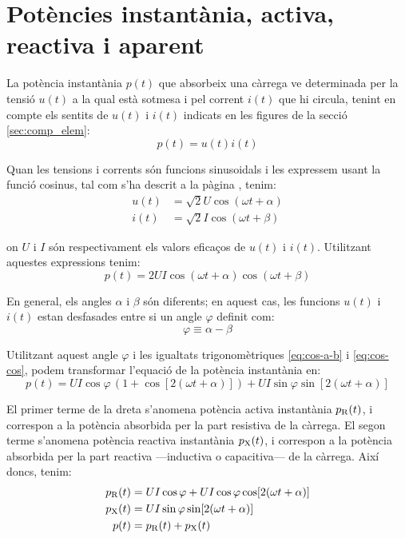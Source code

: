 \section{Potències instantània, activa,  reactiva i aparent}\label{sec:pot-inst-act-react}

La potència instantània $p(t)$ que absorbeix una càrrega ve determinada per la tensió $u(t)$ a la qual està sotmesa i pel corrent $i(t)$ que hi circula, tenint en compte els sentits de $u(t)$ i $i(t)$ indicats en les figures de la secció \ref{sec:comp_elem}:
\begin{equation}
   p(t) = u(t) i(t)
\end{equation}

Quan les tensions i corrents són funcions sinusoidals i les expressem usant la funció cosinus, tal com s'ha descrit a la pàgina \pageref{sec:fasors}, tenim:
\begin{align}
  u(t) &= \sqrt{2} U \cos(\omega t + \alpha) \\
  i(t) &= \sqrt{2} I \cos(\omega t + \beta)
\end{align}

on $U$ i $I$ són respectivament els valors eficaços de $u(t)$ i $i(t)$. Utilitzant aquestes expressions tenim:
\begin{equation}
   p(t) = 2 U I \cos(\omega t + \alpha) \cos(\omega t + \beta) \label{eq:p-instantania}
\end{equation}

En general, els angles $\alpha$ i $\beta$ són diferents; en aquest cas, les funcions $u(t)$ i $i(t)$ estan desfasades entre si un angle $\varphi$ definit com:
\begin{equation}
  \varphi \equiv \alpha - \beta
\end{equation}

Utilitzant aquest angle $\varphi$ i les igualtats trigonomètriques \eqref{eq:cos-a-b} i \eqref{eq:cos-cos}, podem transformar l'equació de la potència instantània en:
\begin{equation}
   p(t) = U I \cos\varphi \,(1 + \cos [2 (\omega t + \alpha)]) + U I \sin\varphi \sin[2 (\omega t + \alpha)]
\end{equation}

El primer terme de la dreta  s'anomena potència activa instantània $p_\mathrm{R}(t)$, i correspon a la potència absorbida per la part resistiva de la càrrega. El segon terme  s'anomena potència reactiva instantània $p_\mathrm{X}(t)$, i correspon a la potència absorbida per la part reactiva ---inductiva o capacitiva--- de la càrrega. Així doncs, tenim:
\begin{subequations}
\begin{align}
  p_\mathrm{R}(t) &=  U I \cos\varphi + U I \cos\varphi \cos [2 (\omega t + \alpha)] \\
  p_\mathrm{X}(t) &=  U I \sin\varphi \sin[2 (\omega t + \alpha)] \\
    p(t) &= p_\mathrm{R}(t) + p_\mathrm{X}(t)
\end{align}
\end{subequations}
	
